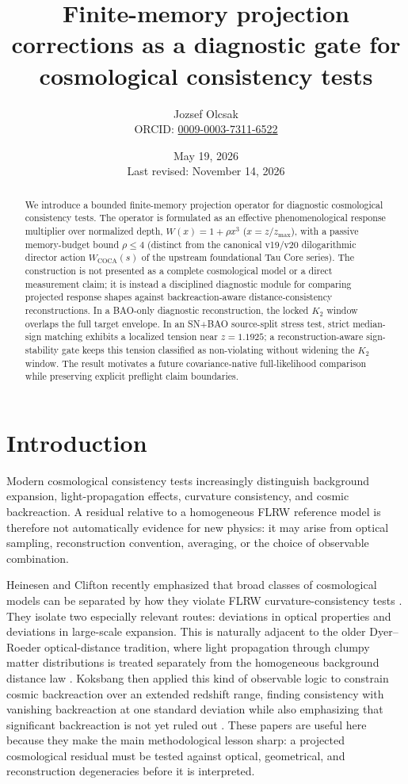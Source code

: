 \documentclass[11pt]{article}
\title{Finite-memory projection corrections as a diagnostic gate for cosmological consistency tests}
\author{Jozsef Olcsak\\{\small ORCID: \href{https://orcid.org/0009-0003-7311-6522}{0009-0003-7311-6522}}}
\date{May 19, 2026\\Last revised: November 14, 2026}
\begin{document}
\maketitle

\begin{abstract}
We introduce a bounded finite-memory projection operator for diagnostic
cosmological consistency tests. The operator is formulated as an effective
phenomenological response multiplier over normalized depth, $W(x)=1+\rho x^3$
($x=z/z_{\max}$), with a passive memory-budget bound $\rho \leq 4$ (distinct
from the canonical v19/v20 dilogarithmic director action $W_{\mathrm{COCA}}(s)$
of the upstream foundational Tau Core series). The construction is not
presented as a complete cosmological model or a direct measurement claim; it is
instead a disciplined diagnostic module for comparing projected response shapes
against backreaction-aware distance-consistency reconstructions. In a BAO-only
diagnostic reconstruction, the locked $K_2$ window overlaps the full target
envelope. In an SN+BAO source-split stress test, strict median-sign matching
exhibits a localized tension near $z=1.1925$; a reconstruction-aware
sign-stability gate keeps this tension classified as non-violating without
widening the $K_2$ window. The result motivates a future covariance-native
full-likelihood comparison while preserving explicit preflight claim boundaries.
\end{abstract}

\section{Introduction}

Modern cosmological consistency tests increasingly distinguish background
expansion, light-propagation effects, curvature consistency, and cosmic
backreaction. A residual relative to a homogeneous FLRW reference model is
therefore not automatically evidence for new physics: it may arise from optical
sampling, reconstruction convention, averaging, or the choice of observable
combination.

Heinesen and Clifton recently emphasized that broad classes of cosmological
models can be separated by how they violate FLRW curvature-consistency tests
\cite{HeinesenClifton2026}.
They isolate two especially relevant routes: deviations in optical properties
and deviations in large-scale expansion. This is naturally adjacent to the
older Dyer--Roeder optical-distance tradition, where light propagation through
clumpy matter distributions is treated separately from the homogeneous
background distance law \cite{DyerRoeder1972,DyerRoeder1973}. Koksbang then applied this kind of
observable logic to constrain cosmic backreaction over an extended redshift
range, finding consistency with vanishing backreaction at one standard
deviation while also emphasizing that significant backreaction is not yet ruled
out \cite{Koksbang2026}. These papers are useful here because they make the main methodological
lesson sharp: a projected cosmological residual must be tested against optical,
geometrical, and reconstruction degeneracies before it is interpreted.
\end{document}
